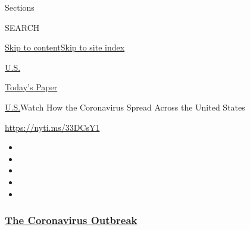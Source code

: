 Sections

SEARCH

\protect\hyperlink{site-content}{Skip to
content}\protect\hyperlink{site-index}{Skip to site index}

\href{https://www.nytimes3xbfgragh.onion/section/us}{U.S.}

\href{https://myaccount.nytimes3xbfgragh.onion/auth/login?response_type=cookie\&client_id=vi}{}

\href{https://www.nytimes3xbfgragh.onion/section/todayspaper}{Today's
Paper}

\href{/section/us}{U.S.}\textbar{}Watch How the Coronavirus Spread
Across the United States

\url{https://nyti.ms/33DCsY1}

\begin{itemize}
\item
\item
\item
\item
\item
\end{itemize}

\hypertarget{the-coronavirus-outbreak}{%
\subsubsection{\texorpdfstring{\href{https://www.nytimes3xbfgragh.onion/news-event/coronavirus?name=styln-coronavirus-national\&region=TOP_BANNER\&variant=undefined\&block=storyline_menu_recirc\&action=click\&pgtype=Interactive\&impression_id=7c496f30-e38e-11ea-9d1b-a1f39ff1b44f}{The
Coronavirus
Outbreak}}{The Coronavirus Outbreak}}\label{the-coronavirus-outbreak}}


